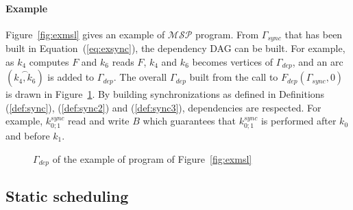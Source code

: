\paragraph{\textbf{Example}} Figure~\ref{fig:exmsl} gives an example of $\mathcal{MSP}$ program. From $\Gamma_{sync}$ that has been built in Equation~(\ref{eq:exsync}), the dependency DAG can be built. For example, as $k_4$ computes $F$ and $k_6$ reads $F$, $k_4$ and $k_6$ becomes vertices of $\Gamma_{dep}$, and an arc $(\overset{\frown}{k_4,k_6})$ is added to $\Gamma_{dep}$. The overall $\Gamma_{dep}$ built from the call to $F_{dep}(\Gamma_{sync},0)$ is drawn in Figure~\ref{fig:depdep}. By building synchronizations as defined in Definitions (\ref{def:sync}), (\ref{def:sync2}) and (\ref{def:sync3}), dependencies are respected. For example, $k_{0;1}^{sync}$ read and write $B$ which guarantees that $k_{0;1}^{sync}$ is performed after $k_0$ and before $k_1$.
\begin{figure}[h!]
\begin{center}
\caption{$\Gamma_{dep}$ of the example of program of Figure~\ref{fig:exmsl}}
\label{fig:depdep}
\end{center}
\end{figure}

\subsection{Static scheduling}
\label{sect:tsp}

